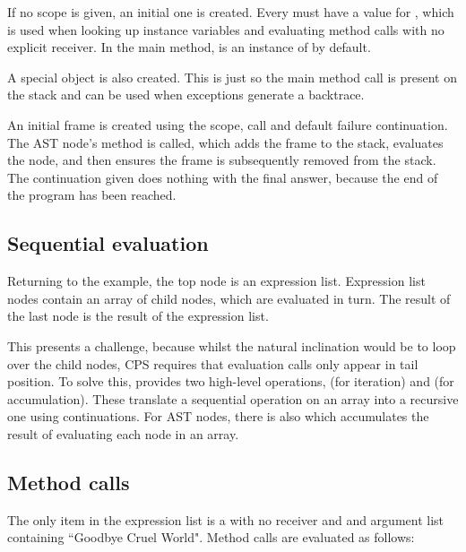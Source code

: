 If no scope is given, an initial one is created. Every  must have a value for , which is used when looking up instance variables and evaluating method calls with no explicit receiver. In the main method,  is an instance of  by default.

A special  object is also created. This is just so the main method call is present on the stack and can be used when exceptions generate a backtrace.

An initial frame is created using the scope, call and default failure continuation. The AST node's  method is called, which adds the frame to the stack, evaluates the node, and then ensures the frame is subsequently removed from the stack. The continuation given does nothing with the final answer, because the end of the program has been reached.

\subsection{Sequential evaluation}

Returning to the example, the top node is an expression list. Expression list nodes contain an array of child nodes, which are evaluated in turn. The result of the last node is the result of the expression list.

This presents a challenge, because whilst the natural inclination would be to loop over the child nodes, CPS requires that evaluation calls only appear in tail position. To solve this,  provides two high-level operations,  (for iteration) and  (for accumulation). These translate a sequential operation on an array into a recursive one using continuations. For AST nodes, there is also  which accumulates the result of evaluating each node in an array.

\subsection{Method calls}

The only item in the expression list is a  with no receiver and and argument list containing ``Goodbye Cruel World". Method calls are evaluated as follows:

